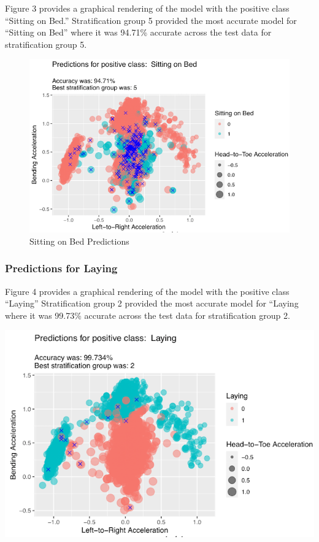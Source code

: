 \documentclass[
]{article}
\begin{document}
Figure 3 provides a graphical rendering of the model with the positive
class ``Sitting on Bed.'' Stratification group 5 provided the most
accurate model for ``Sitting on Bed'' where it was 94.71\% accurate
across the test data for stratification group 5.

\begin{figure}[H]
\includegraphics[width=0.75\linewidth]{./notebooks/R_Notebooks/images/Sitting on Bed Predictions} \caption{Sitting on Bed Predictions}\label{fig:sitting on bed results}
\end{figure}

\newpage

\subsubsection{Predictions for Laying}\label{predictions-for-laying}

Figure 4 provides a graphical rendering of the model with the positive
class ``Laying'' Stratification group 2 provided the most accurate model
for ``Laying where it was 99.73\% accurate across the test data for
stratification group 2.

\includegraphics[width=0.75\linewidth]{./notebooks/R_Notebooks/images/Laying Predictions}
\end{document}
